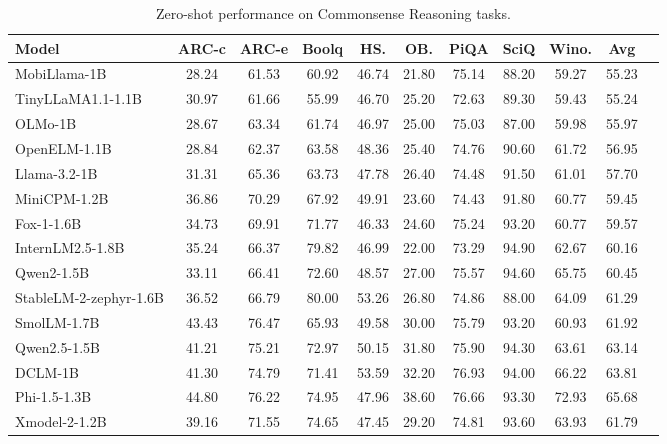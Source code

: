 \documentclass{article}
\newcommand{\llm}{Xmodel-2\xspace}
\begin{document}
\begin{table}[ht]
  \centering
  \setlength{\tabcolsep}{3pt}
  \begin{tabular}{lcccccccccc}
    \toprule
    Model & \textbf{ARC-c} & \textbf{ARC-e} & \textbf{Boolq} & \textbf{HS.} & \textbf{OB.} & \textbf{PiQA} & \textbf{SciQ} & \textbf{Wino.} & \textbf{Avg}\\
    \midrule
    \rowcolor{darkgreen!20}
    MobiLlama-1B\xspace&28.24&61.53&60.92&46.74&21.80&75.14&88.20&59.27&55.23  \\
    \rowcolor{darkgreen!20}
    TinyLLaMA1.1-1.1B\xspace&30.97&61.66&55.99&46.70&25.20&72.63&89.30&59.43&55.24  \\
    \rowcolor{darkgreen!20}
    OLMo-1B\xspace&28.67&63.34&61.74&46.97&25.00&75.03&87.00&59.98&55.97\\
    \rowcolor{darkgreen!20}
    OpenELM-1.1B\xspace&28.84&62.37&63.58&48.36&25.40&74.76&90.60&61.72&56.95 \\
    \rowcolor{darkgreen!20}
    Llama-3.2-1B\xspace&31.31&65.36&63.73&47.78&26.40&74.48&91.50&61.01&57.70 \\

    \rowcolor{darkgreen!20}
    MiniCPM-1.2B\xspace&36.86&70.29&67.92&49.91&23.60&74.43&91.80&60.77&59.45 \\
    \rowcolor{darkgreen!20}
    Fox-1-1.6B\xspace&34.73&69.91&71.77&46.33&24.60&75.24&93.20&60.77&59.57\\ 
    \rowcolor{darkgreen!20}
    InternLM2.5-1.8B\xspace&35.24&66.37&79.82&46.99&22.00&73.29&94.90&62.67&60.16 \\
    \rowcolor{darkgreen!20}
    Qwen2-1.5B\xspace&33.11&66.41&72.60&48.57&27.00&75.57&94.60&65.75&60.45 \\
    \rowcolor{darkgreen!20}
    StableLM-2-zephyr-1.6B\xspace&36.52&66.79&80.00&53.26&26.80&74.86&88.00&64.09&61.29 \\
    \rowcolor{darkred!20}
    SmolLM-1.7B\xspace&43.43&76.47&65.93&49.58&30.00&75.79&93.20&60.93&61.92 \\    
    \rowcolor{darkred!20}
    Qwen2.5-1.5B\xspace&41.21&75.21&72.97&50.15&31.80&75.90&94.30&63.61&63.14 \\
     \rowcolor{darkred!20}
    DCLM-1B\xspace&41.30&74.79&71.41&53.59&32.20&76.93&94.00&66.22&63.81  \\
    \rowcolor{darkred!20}
    Phi-1.5-1.3B\xspace&44.80&76.22&74.95&47.96&38.60&76.66&93.30&72.93&65.68 \\
    
    \midrule
    \rowcolor{xdcolor!20}
    \llm-1.2B\xspace&39.16&71.55&74.65&47.45&29.20&74.81&93.60&63.93&61.79 \\
    \bottomrule
  \end{tabular}
  \newline
  \caption{Zero-shot performance on Commonsense Reasoning tasks. }
  \label{tab:commonsense}
\end{table}
\end{document}
